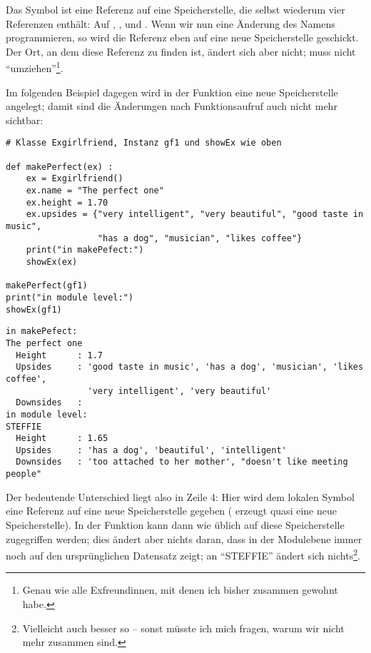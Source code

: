 Das Symbol  ist eine Referenz auf eine Speicherstelle, die selbst wiederum vier Referenzen enthält: Auf , ,  und . Wenn wir nun eine Änderung des Namens programmieren, so wird die Referenz  eben auf eine neue Speicherstelle geschickt. Der Ort, an dem diese Referenz zu finden ist, ändert sich aber nicht;  muss nicht \enquote{umziehen}\footnote{Genau wie alle Exfreundinnen, mit denen ich bisher zusammen gewohnt habe.}.

Im folgenden Beispiel dagegen wird in der Funktion eine neue Speicherstelle angelegt; damit sind die Änderungen nach Funktionsaufruf auch nicht mehr sichtbar:
\begin{codebox}
\begin{verbatim}
# Klasse Exgirlfriend, Instanz gf1 und showEx wie oben

def makePerfect(ex) :
    ex = Exgirlfriend()
    ex.name = "The perfect one"
    ex.height = 1.70
    ex.upsides = {"very intelligent", "very beautiful", "good taste in music",
                  "has a dog", "musician", "likes coffee"}
    print("in makePefect:")
    showEx(ex)
    
makePerfect(gf1)
print("in module level:")
showEx(gf1)
\end{verbatim}
\end{codebox}
\begin{cmdbox}
\begin{verbatim}
in makePefect:
The perfect one
  Height      : 1.7
  Upsides     : 'good taste in music', 'has a dog', 'musician', 'likes coffee',
                'very intelligent', 'very beautiful'
  Downsides   : 
in module level:
STEFFIE
  Height      : 1.65
  Upsides     : 'has a dog', 'beautiful', 'intelligent'
  Downsides   : 'too attached to her mother', "doesn't like meeting people"
\end{verbatim}
\end{cmdbox}

Der bedeutende Unterschied liegt also in Zeile 4: Hier wird dem lokalen Symbol  eine Referenz auf eine neue Speicherstelle gegeben ( erzeugt quasi eine neue Speicherstelle). In der Funktion  kann dann wie üblich auf diese Speicherstelle zugegriffen werden; dies ändert aber nichts daran, dass  in der Modulebene immer noch auf den ursprünglichen Datensatz zeigt; an \enquote{STEFFIE} ändert sich nichts\footnote{Vielleicht auch besser so -- sonst müsste ich mich fragen, warum wir nicht mehr zusammen sind.}.

